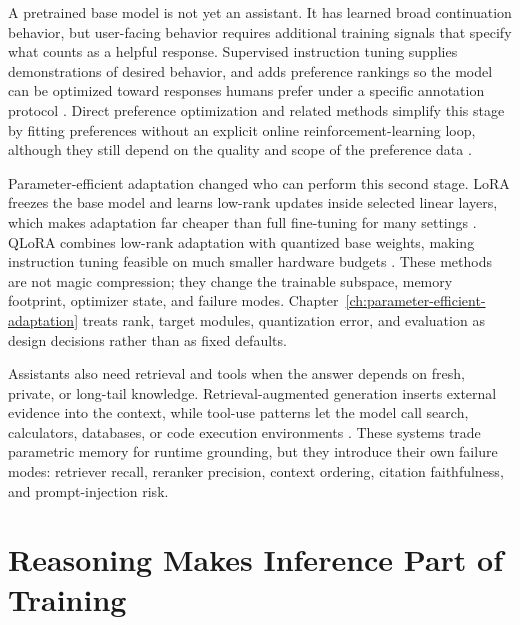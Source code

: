 A pretrained base model is not yet an assistant. It has learned broad continuation behavior, but user-facing behavior requires additional training signals that specify what counts as a helpful response. Supervised instruction tuning supplies demonstrations of desired behavior, and \rlhf adds preference rankings so the model can be optimized toward responses humans prefer under a specific annotation protocol \cite{ouyang2022training}. Direct preference optimization and related methods simplify this stage by fitting preferences without an explicit online reinforcement-learning loop, although they still depend on the quality and scope of the preference data \cite{rafailov2023direct}.

Parameter-efficient adaptation changed who can perform this second stage. LoRA freezes the base model and learns low-rank updates inside selected linear layers, which makes adaptation far cheaper than full fine-tuning for many settings \cite{hu2021lora}. QLoRA combines low-rank adaptation with quantized base weights, making instruction tuning feasible on much smaller hardware budgets \cite{dettmers2023qlora}. These methods are not magic compression; they change the trainable subspace, memory footprint, optimizer state, and failure modes. Chapter~\ref{ch:parameter-efficient-adaptation} treats rank, target modules, quantization error, and evaluation as design decisions rather than as fixed defaults.

Assistants also need retrieval and tools when the answer depends on fresh, private, or long-tail knowledge. Retrieval-augmented generation inserts external evidence into the context, while tool-use patterns let the model call search, calculators, databases, or code execution environments \cite{lewis2020retrieval,yao2023react}. These systems trade parametric memory for runtime grounding, but they introduce their own failure modes: retriever recall, reranker precision, context ordering, citation faithfulness, and prompt-injection risk.

\section{Reasoning Makes Inference Part of Training}
\label{sec:reasoning-inference-training}

